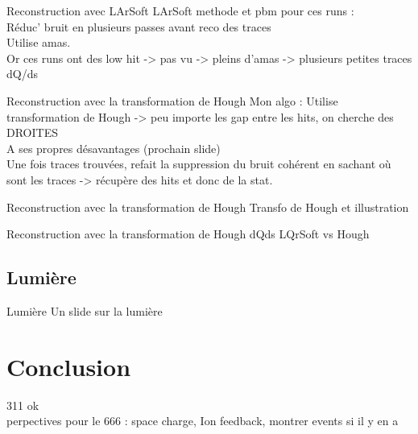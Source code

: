     \begin{frame}{Reconstruction avec LArSoft}
        LArSoft methode et pbm pour ces runs : \\
        Réduc' bruit en plusieurs passes avant reco des traces\\
        Utilise amas.\\
        Or ces runs ont des low hit -> pas vu -> pleins d'amas -> plusieurs petites traces\\
        dQ/ds
    \end{frame}

    \begin{frame}{Reconstruction avec la transformation de Hough}
        Mon algo : Utilise transformation de Hough -> peu importe les gap entre les hits, on cherche des DROITES \\ A ses propres désavantages (prochain slide) \\
        Une fois traces trouvées, refait la suppression du bruit cohérent en sachant où sont les traces -> récupère des hits et donc de la stat.
    \end{frame}

    \begin{frame}{Reconstruction avec la transformation de Hough}
        Transfo de Hough et illustration
    \end{frame}

    \begin{frame}{Reconstruction avec la transformation de Hough}
        dQds LQrSoft vs Hough
    \end{frame}

  \subsection{Lumière}

    \begin{frame}{Lumière}
        Un slide sur la lumière
    \end{frame}

  \section{Conclusion}

    \begin{specialframe}
        \vspace{2cm}\hspace*{-1.8cm}\parbox[t]{\textwidth}{
            311 ok \\
            perpectives pour le 666 : space charge, Ion feedback, montrer events si il y en a
        }
    \end{specialframe}
    

